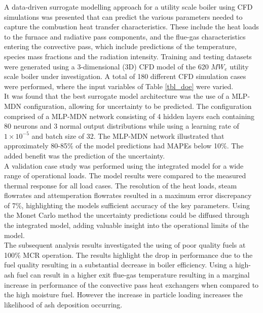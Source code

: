 \documentclass[a4paper,fleqn]{cas-sc}
\begin{document}
A data-driven surrogate modelling approach for a utility scale boiler using CFD simulations was presented that can predict the various parameters needed to capture the combustion heat transfer characteristics. These include the heat loads to the furnace and radiative pass components, and the flue-gas characteristics entering the convective pass, which include predictions of the temperature, species mass fractions and the radiation intensity. Training and testing datasets were generated using a 3-dimensional (3D) CFD model of the 620 $MW_e$ utility scale boiler under investigation. A total of 180 different CFD simulation cases were performed, where the input variables of Table \ref{tbl_doe} were varied.\\

It was found that the best surrogate model architecture was the use of a MLP-MDN configuration, allowing for uncertainty to be predicted. The configuration comprised of a MLP-MDN network consisting of 4 hidden layers each containing 80 neurons and 3 normal output distributions while using a learning rate of $1\times10^{-5}$ and batch size of 32. The MLP-MDN network illustrated that approximately 80-85\% of the model predictions had MAPEs below 10\%. The added benefit was the prediction of the uncertainty.\\

A validation case study was performed using the integrated model for a wide range of operational loads. The model results were compared to the measured thermal response for all load cases. The resolution of the heat loads, steam flowrates and attemperation flowrates resulted in a maximum error discrepancy of 7\%, highlighting the models sufficient accuracy of the key parameters. Using the Monet Carlo method the uncertainty predictions could be diffused through the integrated model, adding valuable insight into the operational limits of the model.\\

The subsequent analysis results investigated the using of poor quality fuels at 100\% MCR operation. The results highlight the drop in performance due to the fuel quality resulting in a substantial decrease in boiler efficiency. Using a high-ash fuel can result in a higher exit flue-gas temperature resulting in a marginal increase in performance of the convective pass heat exchangers when compared to the high moisture fuel. However the increase in particle loading increases the likelihood of ash deposition occurring.\\ 
\end{document}
